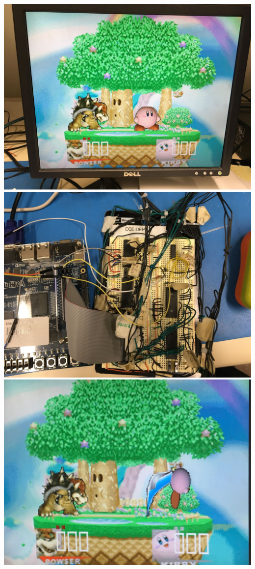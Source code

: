 \documentclass[12pt]{article} %
\begin{document}
\includegraphics[scale=0.1]{pic3}\\
\includegraphics[scale=0.1]{pic4}\\
\includegraphics[scale=0.1]{pic5}\\
\end{document}
